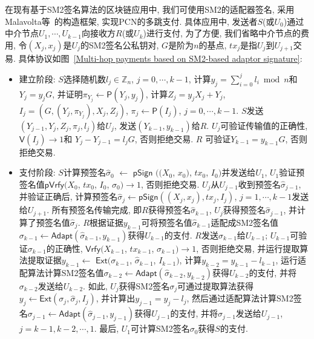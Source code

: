 \documentclass[review]{jcr}
\begin{document}
在现有基于SM2签名算法的区块链应用中, 我们可使用SM2的适配器签名, 采用Malavolta等~\cite{MalavoltaMSKM19,EsginEE20}的构造框架, 实现PCN的多跳支付. 具体应用中, 发送者$S$(或$U_0$)通过中介节点$U_1,\cdots,U_{k−1}$向接收方$R$(或$U_k$)进行支付, 为了方便, 我们省略中介节点的费用, 令$(X_j, x_j)$是$U_j$的SM2签名公私钥对, $G$是阶为$n$的基点, $tx_j$是指$U_j$到$U_{j+1}$交易. 具体协议如图~\ref{Multi-hop payments based on SM2-based adaptor signature}: 

\begin{itemize}
\item 建立阶段: $S$选择随机数$l_j\in \mathbb{Z}_n$, $j=0,\cdots,k-1$, 计算$y_j=\sum_{i=0}^{j}l_i \bmod n$和$Y_j= y_jG$, 并证明$\pi_{Y_j}\leftarrow \mathsf{P}(Y_j,y_j)$, 计算$Z_j=y_jX_j+Y_j$, $I_j=(G,(Y_j,\pi_{Y_j}),X_j,Z_j)$, $\pi_j\leftarrow \mathsf{P}(I_j)$, $j=0,\cdots,k-1$. $S$发送$(Y_{j−1},Y_j,Z_j,\pi_j,l_j)$给$U_j$, 发送$(Y_{k−1},y_{k-1})$给$R$. $U_j$可验证传输值的正确性, $\mathsf{V}(I_j)\rightarrow 1$和 $Y_j-Y_{j−1}=l_jG$, 否则拒绝交易. $R$ 可验证$Y_{k−1}=y_{k-1}G$, 否则拒绝交易. 

\item 支付阶段: $S$计算预签名$\hat{\sigma}_0$ $\leftarrow$ $\mathsf{pSign}$ $((X_0$, $x_0)$, $tx_0$, $I_0)$并发送给$U_1$, $U_1$验证预签名值$\mathsf{pVrfy}$$(X_0$, $tx_0$, $I_0$, $\hat{\sigma}_0)\rightarrow 1$, 否则拒绝交易. $U_j$从$U_{j−1}$收到预签名$\hat{\sigma}_{j−1}$, 并验证正确后, 计算预签名$\hat{\sigma}_j\leftarrow\mathsf{pSign}((X_j, x_j),tx_j,I_j)$, $j = 1,\cdots,k−1$发送给$U_{j+1}$. 所有预签名传输完成, 即$R$获得预签名$\hat{\sigma}_{k−1}$, $U_j$获得预签名$\hat{\sigma}_{j−1}$, 并计算了预签名值$\hat{\sigma}_{j}$. $R$根据证据$y_{k−1}$可将预签名值$\hat{\sigma}_{k-1}$适配成SM2签名值$\sigma_{k−1}\leftarrow \mathsf{Adapt}(\hat{\sigma}_{k-1},y_{k-1})$获得$U_{k−1}$的支付. $R$发送$\sigma_{k−1}$给$U_{k−1}$; $U_{k−1}$可验证$\sigma_{k−1}$的正确性, $\mathsf{Vrfy}$$(X_{k-1}$, $tx_{k-1}$, $\sigma_{k-1})$$\rightarrow 1$, 否则拒绝交易, 并运行提取算法提取证据$y_{k-1}$$\leftarrow$ $\mathsf{Ext}($$\sigma_{k-1}$, $\hat{\sigma}_{k-1}$, $I_{k-1})$, 计算$y_{k-2} = y_{k-1}−l_{k−1}$, 运行适配算法计算SM2签名值$\sigma_{k−2}\leftarrow \mathsf{Adapt}(\hat{\sigma}_{k-2}, y_{k-2})$获得$U_{k−2}$的支付, 并将$\sigma_{k−2}$发送给$U_{k−2}$. 如此, $U_j$获得SM2签名$\sigma_j$可通过提取算法获得$y_j\leftarrow \mathsf{Ext}(\sigma_j,\hat{\sigma}_j,I_j)$, 并计算出$y_{j-1}=y_j-l_{j}$, 然后通过适配算法计算SM2签名$\sigma_{j-1}\leftarrow \mathsf{Adapt}(\hat{\sigma}_{j-1},y_{j-1})$获得$U_{j-1}$的支付, 并将$\sigma_{j-1}$发送给$U_{j-1}$, $j=k-1,k-2,\cdots,1$. 最后, $U_{1}$可计算SM2签名$\sigma_0$获得$S$的支付. 
\end{itemize}
\end{document}
